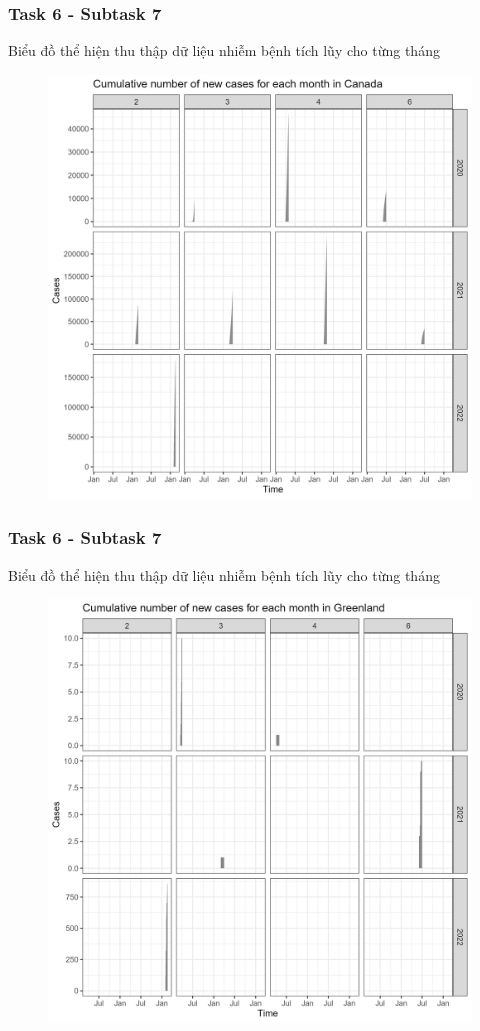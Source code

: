 \documentclass[english,10pt,table]{beamer}
\begin{document}
\frame
{
    \frametitle{Task 6 - Subtask 7}
    \begin{block}{Biểu đồ thể hiện thu thập dữ liệu nhiễm bệnh tích lũy cho từng tháng}
    \begin{figure}[H]
		\centering
		\includegraphics[scale=0.105]{images/6.7.1.png}
	\end{figure}
    \end{block}
}
\frame
{
    \frametitle{Task 6 - Subtask 7}
    \begin{block}{Biểu đồ thể hiện thu thập dữ liệu nhiễm bệnh tích lũy cho từng tháng}
    \begin{figure}[H]
		\centering
		\includegraphics[scale=0.105]{images/6.7.2.png}
	\end{figure}
    \end{block}
}
\end{document}
